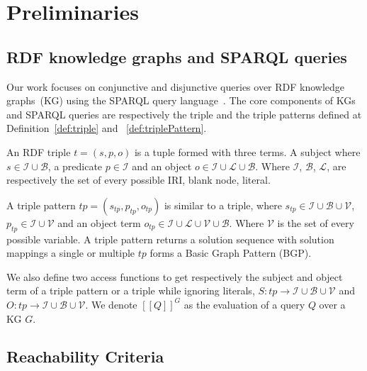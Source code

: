 \section{Preliminaries}\label{sec:preliminaries}

\subsection{RDF knowledge graphs and SPARQL queries}

Our work focuses on conjunctive and disjunctive queries over RDF knowledge graphs~(KG) using the SPARQL query language~\cite{w3SPARQLQuery}.
The core components of KGs and SPARQL queries are respectively the triple and the triple patterns defined at Definition~\ref{def:triple} and ~\ref{def:triplePattern}.

\begin{definition}[Triple]\label{def:triple}
    An RDF triple $t = (s,p,o)$ is a tuple formed with three terms. A subject where $s \in\mathcal{I} \cup \mathcal{B}$, a predicate $p \in \mathcal{I}$ and an object $o \in \mathcal{I} \cup \mathcal{L} \cup \mathcal{B}$.
    Where $\mathcal{I}$, $\mathcal{B}$, $\mathcal{L}$,  are respectively the set of every possible IRI, blank node, literal.
\end{definition}

\begin{definition}\label{def:triplePattern}
    A triple pattern $tp = (s_{tp}, p_{tp}, o_{tp})$ is similar to a triple, where $s_{tp} \in \mathcal{I} \cup \mathcal{B} \cup \mathcal{V}$,
    $p_{tp} \in \mathcal{I} \cup \mathcal{V}$ and an object term  $o_{tp} \in \mathcal{I} \cup \mathcal{L} \cup \mathcal{V} \cup \mathcal{B}$.
    Where $\mathcal{V}$ is the set of every possible variable.
    A triple pattern returns a solution sequence with solution mappings a single or multiple $tp$ forms a Basic Graph Pattern (BGP).
\end{definition}

We also define two access functions to get respectively the subject and object term of a triple pattern or a triple while ignoring literals,
$ S: tp \rightarrow \mathcal{I} \cup \mathcal{B} \cup \mathcal{V}$ and $O: tp \rightarrow \mathcal{I} \cup \mathcal{B} \cup \mathcal{V}$.
We denote $[\![ Q ]\!]^{G}$ as the evaluation of a query $Q$ over a KG $G$.

\subsection{Reachability Criteria}

